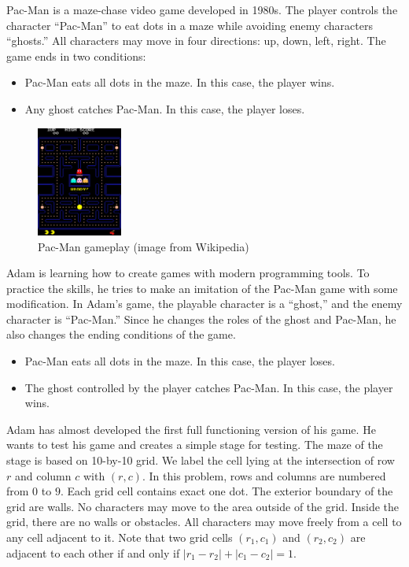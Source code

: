 Pac-Man is a maze-chase video game developed in 1980s. 
The player controls the character ``Pac-Man'' to eat dots in a maze while
avoiding enemy characters ``ghosts.'' 
All characters may move in four directions: up, down, left, right.
The game ends in two conditions:
\begin{itemize}
\tightlist
\item Pac-Man eats all dots in the maze. In this case, the player wins.
\item Any ghost catches Pac-Man. In this case, the player loses.
\end{itemize}

\begin{figure}[h]
\center
\includegraphics[width=0.25\textwidth]{image/pacman.png}
\caption{Pac-Man gameplay (image from Wikipedia)}
\end{figure}

Adam is learning how to create games with modern programming tools.
To practice the skills, he tries to make an imitation of the Pac-Man 
game with some modification.
In Adam's game, the playable character is a ``ghost,'' 
and the enemy character is ``Pac-Man.'' 
Since he changes the roles of the ghost and Pac-Man, 
he also changes the ending conditions of the game.
\begin{itemize}
\tightlist
\item Pac-Man eats all dots in the maze. In this case, the player loses.
\item The ghost controlled by the player catches Pac-Man. In this case, the player wins.
\end{itemize}

Adam has almost developed the first full functioning version of his game.
He wants to test his game and creates a simple stage for testing.
The maze of the stage is based on 10-by-10 grid. 
We label the cell lying at the intersection of row $r$ and column $c$ with 
$(r,c)$. In this problem, rows and columns are numbered from $0$ to $9$.
Each grid cell contains exact one dot.
The exterior boundary of the grid are walls. 
No characters may move to the area outside of the grid.
Inside the grid, there are no walls or obstacles.
All characters may move freely from a cell to any cell adjacent to it.
Note that two grid cells $(r_1,c_1)$ and $(r_2,c_2)$ are adjacent to each other 
if and only if $|r_1-r_2|+|c_1-c_2|=1$.
 

